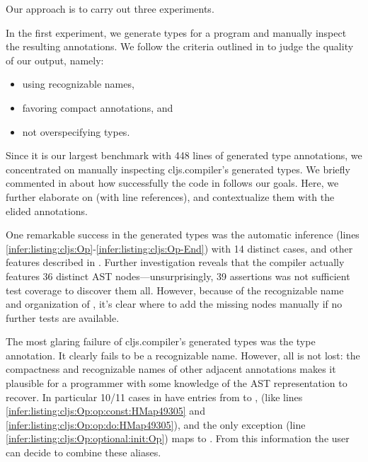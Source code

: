Our approach is to carry out three experiments.

\label{infer:sec:experiment1}

In the first experiment, we generate types for
a program and manually inspect the resulting
annotations.
We follow the criteria 
outlined in 
to judge the quality of our output, namely:
\begin{itemize}
  \item using recognizable names,
  \item favoring compact annotations, and
  \item not overspecifying types.
\end{itemize}

Since it is our largest benchmark with 448 lines
of generated type annotations,
we concentrated on manually inspecting cljs.compiler's
generated types.
We briefly commented
in 
about how successfully the code in 
follows our goals.
Here, we further elaborate on 
(with line references), and contextualize them
with the elided annotations.

One remarkable success in the generated types
was the automatic inference  (lines \ref{infer:listing:cljs:Op}-\ref{infer:listing:cljs:Op-End})
with 14 distinct cases, and other features described in .
Further investigation reveals that
the compiler actually features 36 distinct AST nodes---unsurprisingly, 39 assertions was not sufficient
test coverage to discover them all.
However, because of the recognizable name and organization of
, it's clear where to add the missing nodes
manually if no further tests are available.

The most glaring failure of cljs.compiler's
generated types was the  type annotation.
It clearly fails to be a recognizable name.
However, all is not lost:
the compactness and recognizable names of other adjacent annotations
makes it plausible for a programmer with some
knowledge of the AST representation to 
recover.
In particular 10/11 cases in 
have entries from  to , 
(like lines \ref{infer:listing:cljs:Op:op:const:HMap49305} and \ref{infer:listing:cljs:Op:op:do:HMap49305}),
and the only exception (line \ref{infer:listing:cljs:Op:optional:init:Op})
maps to . From this information the user can
decide to combine these aliases.

